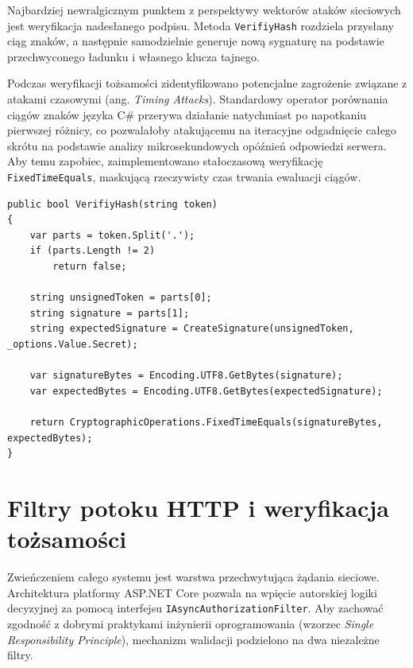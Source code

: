 \documentclass{SGGW-thesis}
\begin{document}
\vspace{2cm}

Najbardziej newralgicznym punktem z perspektywy wektorów ataków sieciowych jest weryfikacja nadesłanego podpisu. Metoda \texttt{VerifiyHash} rozdziela przysłany ciąg znaków, a następnie samodzielnie generuje nową sygnaturę na podstawie przechwyconego ładunku i własnego klucza tajnego.

Podczas weryfikacji tożsamości zidentyfikowano potencjalne zagrożenie związane z atakami czasowymi (ang. \textit{Timing Attacks}). Standardowy operator porównania ciągów znaków języka C\# przerywa działanie natychmiast po napotkaniu pierwszej różnicy, co pozwalałoby atakującemu na iteracyjne odgadnięcie całego skrótu na podstawie analizy mikrosekundowych opóźnień odpowiedzi serwera. Aby temu zapobiec, zaimplementowano stałoczasową weryfikację \texttt{FixedTimeEquals}, maskującą rzeczywisty czas trwania ewaluacji ciągów.

\clearpage

\begin{minipage}{\textwidth}
\begin{lstlisting}    
public bool VerifiyHash(string token)
{
    var parts = token.Split('.');
    if (parts.Length != 2)
        return false;

    string unsignedToken = parts[0];
    string signature = parts[1];
    string expectedSignature = CreateSignature(unsignedToken, _options.Value.Secret);

    var signatureBytes = Encoding.UTF8.GetBytes(signature);
    var expectedBytes = Encoding.UTF8.GetBytes(expectedSignature);

    return CryptographicOperations.FixedTimeEquals(signatureBytes, expectedBytes);
}
\end{lstlisting}
\end{minipage}

\clearpage

\section{Filtry potoku HTTP i weryfikacja tożsamości}

Zwieńczeniem całego systemu jest warstwa przechwytująca żądania sieciowe. Architektura platformy ASP.NET Core pozwala na wpięcie autorskiej logiki decyzyjnej za pomocą interfejsu \texttt{IAsyncAuthorizationFilter}. Aby zachować zgodność z dobrymi praktykami inżynierii oprogramowania (wzorzec \textit{Single Responsibility Principle}), mechanizm walidacji podzielono na dwa niezależne filtry.
\end{document}
